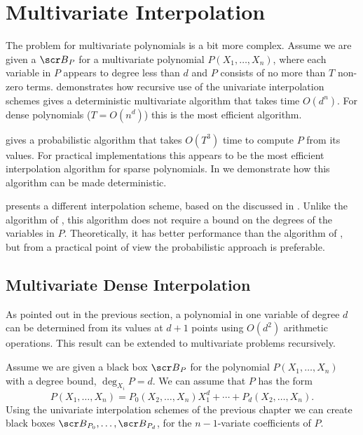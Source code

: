 \chapter{Multivariate Interpolation}
\label{Sparse:Interp:Chap}

The problem for multivariate polynomials is a bit more complex.
Assume we are given a  ${\scr B}_P$ for a multivariate
polynomial $P(X_1, \ldots, X_n)$, where each variable in $P$ appears
to degree less than $d$ and $P$ consists of no more than $T$ non-zero
terms.   demonstrates how recursive use of
the univariate interpolation schemes gives a deterministic
multivariate algorithm that takes time $O(d^n)$.  For dense
polynomials ($T = O(n^d)$) this is the most efficient algorithm.

 gives a probabilistic algorithm that
takes $O(T^3)$ time to compute $P$ from its values.  For practical
implementations this appears to be the most efficient interpolation
algorithm for sparse polynomials.  In  we
demonstrate how this algorithm can be made deterministic.

 presents a different interpolation scheme,
based on the  discussed in
.  Unlike the algorithm of
, this algorithm does not require a bound
on the degrees of the variables in $P$.  Theoretically, it has better
performance than the algorithm of , but from a practical
point of view the probabilistic approach is preferable.


\section{Multivariate Dense Interpolation}
\label{Interp:MDense:Sec}

As pointed out in the previous section, a polynomial in one variable
of degree $d$ can be determined from its values at $d+1$ points using
$O(d^2)$ arithmetic operations.  This result can be extended to
multivariate problems recursively.

Assume we are given a black box ${\scr B}_P$ for the polynomial
$P(X_1, \ldots, X_n)$ with a degree bound, $\deg_{X_i} P = d$.  
We can assume that $P$ has the form
\[
P(X_1, \ldots, X_n) = P_0(X_2, \ldots, X_n) X_1^d + 
\cdots + P_d(X_2, \ldots, X_n).
\]
Using the univariate interpolation schemes of the previous chapter
we can create black boxes ${\scr B}_{P_0}, \ldots, {\scr B}_{P_d}$, for
the $n-1$-variate coefficients of $P$.

